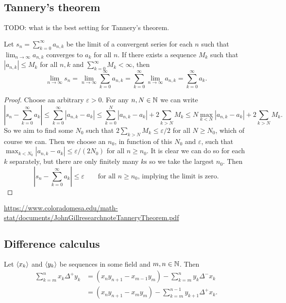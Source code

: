 \subsection{Tannery's theorem}
TODO: what is the best setting for Tannery's theorem.
\begin{theorem} \label{tannery}
Let $s_n = \sum_{k=0}^\infty a_{n,k}$ be the limit of a convergent series for each $n$ such that $\lim_{n\to \infty}a_{n,k}$ converges to $a_k$ for all $n$. If there exists a sequence $M_k$ such that $|a_{n,k}|\leq M_k$ for all $n,k$ and $\sum_{k=0}^\infty M_k<\infty$, then
\[ \lim_{n\to\infty} s_n = \lim_{n\to\infty}\sum_{k=0}^\infty a_{n,k} = \sum_{k=0}^\infty\lim_{n\to\infty} a_{n,k} = \sum_{k=0}^\infty a_k.   \]
\end{theorem}
\begin{proof}
Choose an arbitrary $\varepsilon>0$. For any $n,N\in\mathbb{N}$ we can write
\[ \left|s_n - \sum_{k=0}^\infty a_k\right| \leq \sum_{k=0}^\infty\left|a_{n,k} -  a_k\right|\leq \sum_{k=0}^N\left|a_{n,k} -  a_k\right| + 2\sum_{k>N}M_k \leq N\max_{k<N}\left|a_{n,k} -  a_k\right| + 2\sum_{k>N}M_k. \]
So we aim to find some $N_0$ such that $2\sum_{k>N}M_k \leq \varepsilon/2$ for all $N\geq N_0$, which of course we can. Then we choose an $n_0$, in function of this $N_0$ and $\varepsilon$, such that $\max_{k<N_0}\left|a_{n,k} -  a_k\right|\leq \varepsilon/(2N_0)$ for all $n\geq n_0$. It is clear we can do so for each $k$ separately, but there are only finitely many $k$s so we take the largest $n_0$. Then
\[ \left|s_n - \sum_{k=0}^\infty a_k\right| \leq \varepsilon \qquad \text{for all $n\geq n_0$, implying the limit is zero.} \]
\end{proof}
\url{https://www.coloradomesa.edu/math-stat/documents/JohnGillresearchnoteTanneryTheorem.pdf}

\subsection{Difference calculus}

\begin{proposition}
Let $\left\langle x_k \right\rangle$ and $\left\langle y_k \right\rangle$ be sequences in some field and $m,n\in \mathbb{N}$. Then
\begin{align*}
\sum_{k=m}^n x_k\Delta^+y_k &= (x_ny_{n+1} - x_{m-1}y_m)-\sum_{k=m}^ny_k\Delta^-x_k \\
&= (x_ny_{n+1} - x_my_m) - \sum_{k=m}^{n-1}y_{k+1}\Delta^+x_k.
\end{align*}
\end{proposition}


